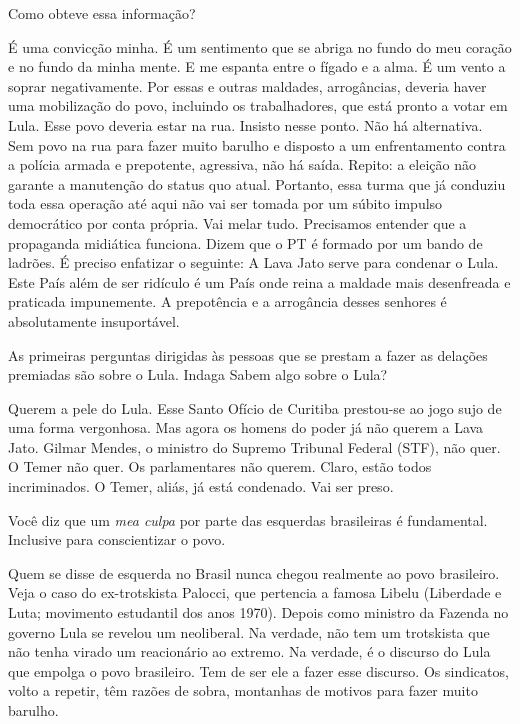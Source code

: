 Como obteve essa informação?

 É uma convicção minha. É um sentimento que se abriga no fundo do meu
coração e no fundo da minha mente. E me espanta entre o fígado e a alma.
É um vento a soprar negativamente. Por essas e outras maldades,
arrogâncias, deveria haver uma mobilização do povo, incluindo os
trabalhadores, que está pronto a votar em Lula. Esse povo deveria estar
na rua. Insisto nesse ponto. Não há alternativa. Sem povo na rua para
fazer muito barulho e disposto a um enfrentamento contra a polícia
armada e prepotente, agressiva, não há saída. Repito: a eleição não
garante a manutenção do status quo atual. Portanto, essa turma que já
conduziu toda essa operação até aqui não vai ser tomada por um súbito
impulso democrático por conta própria. Vai melar tudo. Precisamos
entender que a propaganda midiática funciona. Dizem que o PT é formado
por um bando de ladrões. É preciso enfatizar o seguinte: A Lava Jato
serve para condenar o Lula. Este País além de ser ridículo é um País
onde reina a maldade mais desenfreada e praticada impunemente. A
prepotência e a arrogância desses senhores é absolutamente insuportável.

 As primeiras perguntas dirigidas às pessoas que se prestam a fazer as
delações premiadas são sobre o Lula. Indaga Sabem algo sobre o Lula?

 Querem a pele do Lula. Esse Santo Ofício de Curitiba prestou-se ao
jogo sujo de uma forma vergonhosa. Mas agora os homens do poder já não
querem a Lava Jato. Gilmar Mendes, o ministro do Supremo Tribunal
Federal (STF), não quer. O Temer não quer. Os parlamentares não querem.
Claro, estão todos incriminados. O Temer, aliás, já está condenado. Vai
ser preso.

 Você diz que um \emph{mea culpa} por parte das esquerdas brasileiras
é fundamental. Inclusive para conscientizar o povo.

 Quem se disse de esquerda no Brasil nunca chegou realmente ao povo
brasileiro. Veja o caso do ex-trotskista Palocci, que pertencia a famosa
Libelu (Liberdade e Luta; movimento estudantil dos anos 1970). Depois
como ministro da Fazenda no governo Lula se revelou um neoliberal. Na
verdade, não tem um trotskista que não tenha virado um reacionário ao
extremo. Na verdade, é o discurso do Lula que empolga o povo brasileiro.
Tem de ser ele a fazer esse discurso. Os sindicatos, volto a repetir,
têm razões de sobra, montanhas de motivos para fazer muito barulho.

